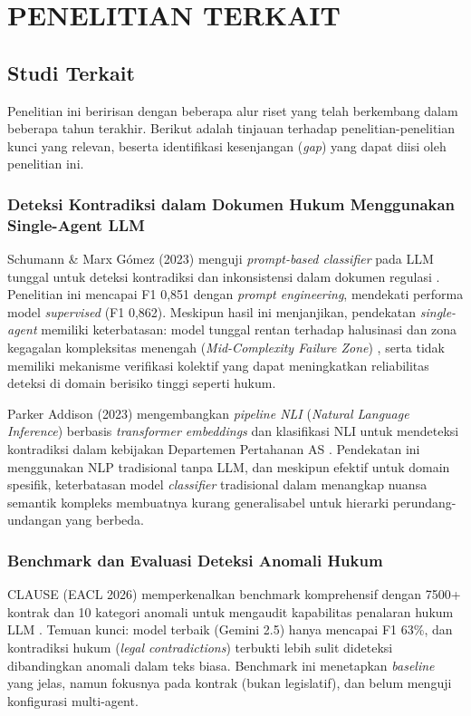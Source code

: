\chapter{PENELITIAN TERKAIT}

\section{Studi Terkait}

Penelitian ini beririsan dengan beberapa alur riset yang telah berkembang dalam beberapa tahun terakhir. Berikut adalah tinjauan terhadap penelitian-penelitian kunci yang relevan, beserta identifikasi kesenjangan (\textit{gap}) yang dapat diisi oleh penelitian ini.

\subsection{Deteksi Kontradiksi dalam Dokumen Hukum Menggunakan Single-Agent LLM}

Schumann \& Marx Gómez (2023) menguji \textit{prompt-based classifier} pada LLM tunggal untuk deteksi kontradiksi dan inkonsistensi dalam dokumen regulasi \cite{schumann2023}. Penelitian ini mencapai F1 0,851 dengan \textit{prompt engineering}, mendekati performa model \textit{supervised} (F1 0,862). Meskipun hasil ini menjanjikan, pendekatan \textit{single-agent} memiliki keterbatasan: model tunggal rentan terhadap halusinasi dan zona kegagalan kompleksitas menengah (\textit{Mid-Complexity Failure Zone}) \cite{clause2026}, serta tidak memiliki mekanisme verifikasi kolektif yang dapat meningkatkan reliabilitas deteksi di domain berisiko tinggi seperti hukum.

Parker Addison (2023) mengembangkan \textit{pipeline NLI} (\textit{Natural Language Inference}) berbasis \textit{transformer embeddings} dan klasifikasi NLI untuk mendeteksi kontradiksi dalam kebijakan Departemen Pertahanan AS \cite{parker2023}. Pendekatan ini menggunakan NLP tradisional tanpa LLM, dan meskipun efektif untuk domain spesifik, keterbatasan model \textit{classifier} tradisional dalam menangkap nuansa semantik kompleks membuatnya kurang generalisabel untuk hierarki perundang-undangan yang berbeda.

\subsection{Benchmark dan Evaluasi Deteksi Anomali Hukum}

CLAUSE (EACL 2026) memperkenalkan benchmark komprehensif dengan 7500+ kontrak dan 10 kategori anomali untuk mengaudit kapabilitas penalaran hukum LLM \cite{clause2026}. Temuan kunci: model terbaik (Gemini 2.5) hanya mencapai F1 63\%, dan kontradiksi hukum (\textit{legal contradictions}) terbukti lebih sulit dideteksi dibandingkan anomali dalam teks biasa. Benchmark ini menetapkan \textit{baseline} yang jelas, namun fokusnya pada kontrak (bukan legislatif), dan belum menguji konfigurasi multi-agent.

